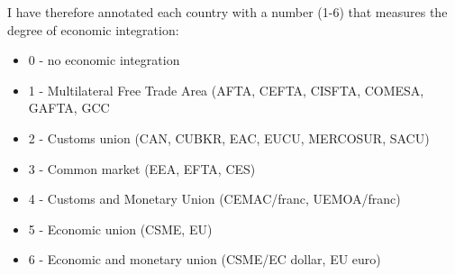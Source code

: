 \documentclass[11pt,a4paper,oneside]{report}
\begin{document}
I have therefore annotated each country with a number (1-6) that measures the degree of economic integration:
\begin{itemize}
 \item 0 - no economic integration 
 \item 1 - Multilateral Free Trade Area (AFTA, CEFTA, CISFTA, COMESA, GAFTA, GCC
 \item 2 - Customs union (CAN, CUBKR, EAC, EUCU, MERCOSUR, SACU)
 \item 3 - Common market (EEA, EFTA, CES) 
 \item 4 - Customs and Monetary Union (CEMAC/franc, UEMOA/franc) 
 \item 5 - Economic union (CSME, EU) 
 \item 6 - Economic and monetary union (CSME/EC dollar, EU euro)
\end{itemize}
\end{document}
